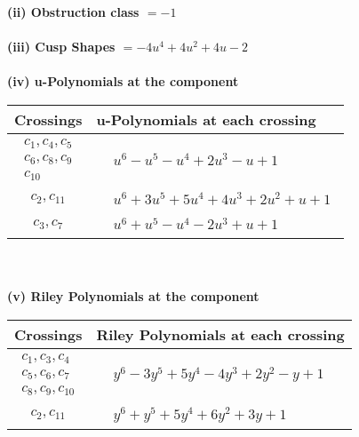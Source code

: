\documentclass[1p]{elsarticle_modified}
\theoremstyle{definition}
\begin{document}
\flushleft \textbf{(ii) Obstruction class $= -1$}\\~\\
\flushleft \textbf{(iii) Cusp Shapes $= -4 u^4+4 u^2+4 u-2$}\\~\\
\newpage\renewcommand{\arraystretch}{1}
\flushleft \textbf{(iv) u-Polynomials at the component}\newline \\
\begin{tabular}{m{50pt}|m{274pt}}
Crossings & \hspace{64pt}u-Polynomials at each crossing \\
\hline $$\begin{aligned}c_{1},c_{4},c_{5}\\c_{6},c_{8},c_{9}\\c_{10}\end{aligned}$$&$\begin{aligned}
&u^6- u^5- u^4+2 u^3- u+1
\end{aligned}$\\
\hline $$\begin{aligned}c_{2},c_{11}\end{aligned}$$&$\begin{aligned}
&u^6+3 u^5+5 u^4+4 u^3+2 u^2+u+1
\end{aligned}$\\
\hline $$\begin{aligned}c_{3},c_{7}\end{aligned}$$&$\begin{aligned}
&u^6+u^5- u^4-2 u^3+u+1
\end{aligned}$\\
\hline
\end{tabular}\\~\\
\newpage\renewcommand{\arraystretch}{1}
\flushleft \textbf{(v) Riley Polynomials at the component}\newline \\
\begin{tabular}{m{50pt}|m{274pt}}
Crossings & \hspace{64pt}Riley Polynomials at each crossing \\
\hline $$\begin{aligned}c_{1},c_{3},c_{4}\\c_{5},c_{6},c_{7}\\c_{8},c_{9},c_{10}\end{aligned}$$&$\begin{aligned}
&y^6-3 y^5+5 y^4-4 y^3+2 y^2- y+1
\end{aligned}$\\
\hline $$\begin{aligned}c_{2},c_{11}\end{aligned}$$&$\begin{aligned}
&y^6+y^5+5 y^4+6 y^2+3 y+1
\end{aligned}$\\
\hline
\end{tabular}\\~\\
\end{document}

